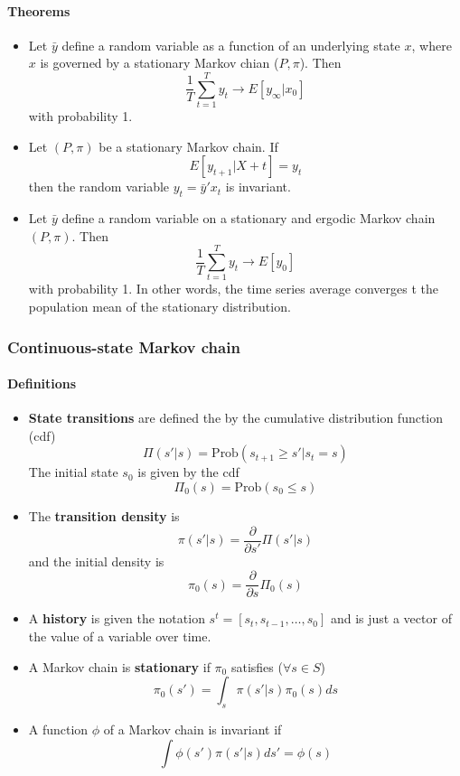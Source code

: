 \documentclass[11pt]{article}
\begin{document}
\paragraph{Theorems}
\label{sec-1-1-1-3}


\begin{itemize}
\item Let $\bar{y}$ define a random variable as a function of an
  underlying state $x$, where $x$ is governed by a stationary Markov
  chian ($P, \pi$). Then $$ \frac{1}{T} \sum_{t=1}^T y_t \rightarrow
  E[y_{\infty} |x_0]$$ with probability 1.
\item Let $(P, \pi)$ be a stationary Markov chain. If $$E[y_{t+1}|X+t] =
  y_t$$ then the random variable $y_t = \bar{y}' x_t$ is invariant.
\item Let $\bar{y}$ define a random variable on a stationary and ergodic
  Markov chain $(P, \pi)$. Then $$ \frac{1}{T} \sum_{t=1}^T y_t
  \rightarrow E[y_0]$$ with probability 1. In other words, the time
  series average converges t the population mean of the stationary
  distribution.
\end{itemize}
\subsubsection{Continuous-state Markov chain}
\label{sec-1-1-2}
\paragraph{Definitions}
\label{sec-1-1-2-1}

\begin{itemize}
\item \textbf{State transitions} are defined the by the cumulative distribution
  function (cdf) $$\Pi(s'|s) = \text{Prob}(s_{t+1} \ge s'|s_t=s)$$ The
  initial state $s_0$ is given by the cdf $$\Pi_0(s) = \text{Prob}(s_0
  \le s)$$
\item The \textbf{transition density} is $$\pi(s'|s) = \frac{\partial}{\partial
  s'} \Pi(s'|s)$$ and the initial density is $$\pi_0(s) =
  \frac{\partial}{\partial s} \Pi_0(s) $$
\item A \textbf{history} is given the notation $s^t = [s_t, s_{t-1}, \dots, s_0]$
  and is just a vector of the value of a variable over time.
\item A Markov chain is \textbf{stationary} if $\pi_0$ satisfies ($\forall s \in
  S$) $$\pi_0(s') = \int_s \pi(s'|s) \pi_0(s) ds$$
\item A function $\phi$ of a Markov chain is invariant if $$ \int \phi(s')
  \pi(s'|s)ds' = \phi(s)$$
\end{itemize}
\end{document}
